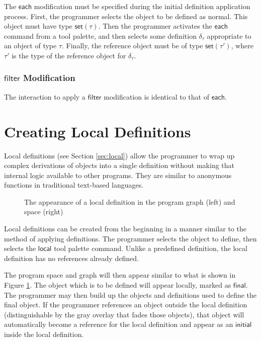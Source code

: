 \documentclass[twoside,openright,11pt]{report}
\begin{document}
The $\mathsf{each}$ modification must be specified during the initial definition application process.
First, the programmer selects the object to be defined as normal. 
This object must have type $\mathsf{set}(\tau)$.
Then the programmer activates the $\mathsf{each}$ command from a tool palette, and then selects some definition $\delta_\tau$ appropriate to an object of type $\tau$.
Finally, the reference object must be of type $\mathsf{set}(\tau')$, where $\tau'$ is the type of the reference object for $\delta_\tau$.

\subsubsection{$\mathsf{filter}$ Modification}

The interaction to apply a $\mathsf{filter}$ modification is identical to that of $\mathsf{each}.$

\section{Creating Local Definitions}
\label{sec:create-local}

Local definitions (see Section \ref{sec:local}) allow the programmer to wrap up complex derivations of objects into a single definition without making that internal logic available to other programs.
They are similar to anonymous functions in traditional text-based languages.

\begin{figure}[h]
  \centering
  \fbox{
    \begin{minipage}{3in}\hfill\vspace{2in}\end{minipage}
  }
  \fbox{
    \begin{minipage}{3in}\hfill\vspace{2in}\end{minipage}
  }
  \caption{The appearance of a local definition in the program graph (left) and space (right)}
  \label{fig:local}
\end{figure}

Local definitions can be created from the beginning in a manner similar to the method of applying definitions.
The programmer selects the object to define, then selects the $\mathsf{local}$ tool palette command. 
Unlike a predefined definition, the local definition has no references already defined.

The program space and graph will then appear similar to what is shown in Figure \ref{fig:local}. 
The object which is to be defined will appear locally, marked as $\mathsf{final}$. 
The programmer may then build up the objects and definitions used to define the final object.
If the programmer references an object outside the local definition (distinguishable by the gray overlay that fades those objects), that object will automatically become a reference for the local definition and appear as an $\mathsf{initial}$ inside the local definition.
\end{document}
